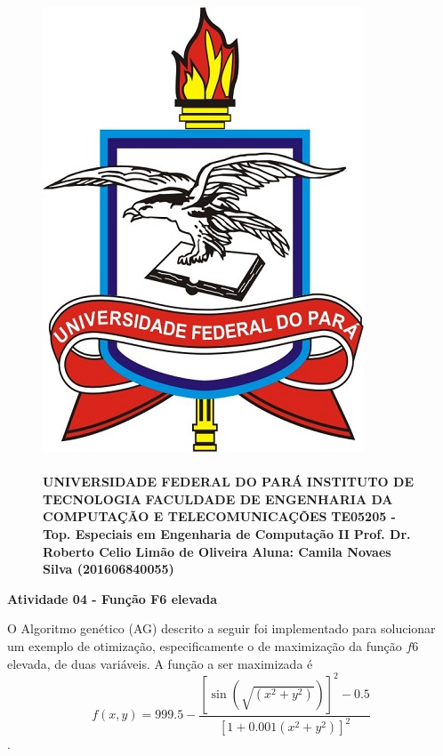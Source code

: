 \documentclass[12pt]{article}
\title{}
\date{}
\begin{document}
\begin{figure}
		\begin{minipage}{.3\linewidth}
			\centering
			\includegraphics[width=.6\linewidth]{imgs/ufpa.jpg}
		\end{minipage}
		\begin{minipage}{.70\linewidth}
			\flushleft
			\paragraph{}
			\textbf{ }\newline
			\textbf{UNIVERSIDADE FEDERAL DO PARÁ} \newline
			\textbf{INSTITUTO DE TECNOLOGIA} \newline
			\textbf{FACULDADE DE ENGENHARIA DA COMPUTAÇÃO E TELECOMUNICAÇÕES} \newline
			\textbf{TE05205 - Top. Especiais em Engenharia de Computação II} \newline
            \textbf{Prof. Dr. Roberto Celio Limão de Oliveira} \newline
            \textbf{Aluna: Camila Novaes Silva (201606840055)}
		\end{minipage}
\end{figure}
\FloatBarrier
\begin{center}
    {\Large \textbf{Atividade 04 - Função F6 elevada}}
\end{center}
\hfill

O Algoritmo genético (AG) descrito a seguir foi implementado para solucionar um exemplo
de otimização, especificamente o de maximização da função $f6$ elevada, de duas variáveis.
A função a ser maximizada é
$$f(x,y) = 999.5 - \frac{[\sin(\sqrt{(x^2 + y^2)})]^2 - 0.5}{[1 + 0.001(x^2 + y^2)]^2}$$.
\end{document}
